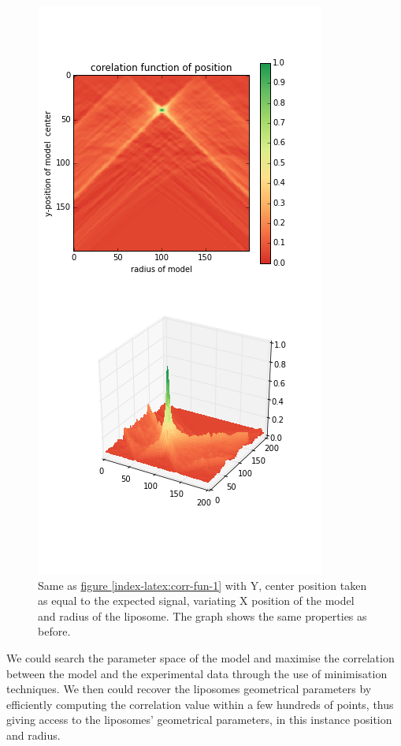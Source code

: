 \documentclass[A4paperpaper,11pt,english]{sphinxmanual}
\begin{document}
\begin{figure}[htbp]
\centering
\capstart

\includegraphics[width=0.600\linewidth]{c-R-_100-by-100-RC-40_0-noise-0_5-delta-4_0_.png}
\caption{Same as \hyperref[index-latex:corr-fun-1]{figure  \ref*{index-latex:corr-fun-1}}  with Y, center position taken
as equal to the expected signal, variating X position of the model and
radius of the liposome. The graph shows the same properties as before.}\label{index-latex:corr-fun-2}\end{figure}

We could search the parameter space of the model and
maximise the correlation between the model and the experimental data through the use of minimisation techniques. We then
could recover the liposomes geometrical parameters by
efficiently computing the correlation value within a few hundreds of
points, thus giving access to the liposomes' geometrical parameters, in this instance position
and radius.
\end{document}
